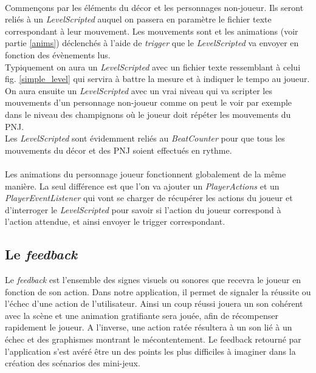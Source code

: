 \paragraph{}
Commençons par les éléments du décor et les personnages non-joueur. Ils seront reliés à un \textit{LevelScripted} auquel on passera en paramètre le fichier texte correspondant à leur mouvement. Les mouvements sont et les animations (voir partie \ref{anims}) déclenchés à l'aide de \textit{trigger} que le \textit{LevelScripted} va envoyer en fonction des évènements lus. \\
Typiquement on aura un \textit{LevelScripted} avec un fichier texte ressemblant à celui fig. \ref{simple_level} qui servira à battre la mesure et à indiquer le tempo au joueur.\\
On aura ensuite un \textit{LevelScripted} avec un vrai niveau qui va scripter les mouvements d'un personnage non-joueur comme on peut le voir par exemple dans le niveau des champignons où le joueur doit répéter les mouvements du PNJ.\\
Les \textit{LevelScripted} sont évidemment reliés au \textit{BeatCounter} pour que tous les mouvements du décor et des PNJ soient effectués en rythme.

\paragraph{}
Les animations du personnage joueur fonctionnent globalement de la même manière. La seul différence est que l'on va ajouter un \textit{PlayerActions} et un \textit{PlayerEventListener} qui vont se charger de récupérer les actions du joueur et d'interroger le \textit{LevelScripted} pour savoir si l'action du joueur correspond à l'action attendue, et ainsi envoyer le trigger correspondant. 

\subsection{Le \textit{feedback}}

Le \textit{feedback} est l'ensemble des signes visuels ou sonores que recevra le joueur en fonction de son action. Dans notre application, il permet de signaler la réussite ou l'échec d'une action de l'utilisateur. Ainsi un coup réussi jouera un son cohérent avec la scène et une animation gratifiante sera jouée, afin de récompenser rapidement le joueur. A l'inverse, une action ratée résultera à un son lié à un échec et des graphismes montrant le mécontentement.
Le feedback retourné par l'application s'est avéré être un des points les plus difficiles à imaginer dans la création des scénarios des mini-jeux.

